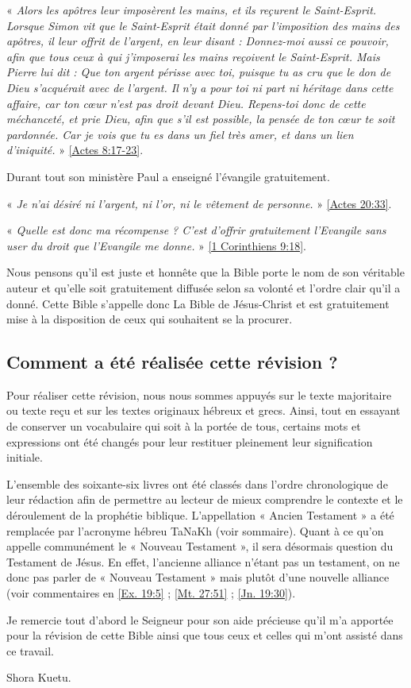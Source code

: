 « \emph{Alors les apôtres leur imposèrent les mains, et ils reçurent le Saint-Esprit. Lorsque Simon vit que le Saint-Esprit était donné par l'imposition des mains des apôtres, il leur offrit de l'argent, en leur disant : Donnez-moi aussi ce pouvoir, afin que tous ceux à qui j'imposerai les mains reçoivent le Saint-Esprit. Mais Pierre lui dit : Que ton argent périsse avec toi, puisque tu as cru que le don de Dieu s'acquérait avec de l'argent. Il n’y a pour toi ni part ni héritage dans cette affaire, car ton cœur n'est pas droit devant Dieu. Repens-toi donc de cette méchanceté, et prie Dieu, afin que s'il est possible, la pensée de ton cœur te soit pardonnée. Car je vois que tu es dans un fiel très amer, et dans un lien d'iniquité.} » \vref{Actes 8:17-23}.

Durant tout son ministère Paul a enseigné l’évangile gratuitement.

« \emph{Je n'ai désiré ni l'argent, ni l'or, ni le vêtement de personne.} » \vref{Actes 20:33}.

« \emph{Quelle est donc ma  récompense ? C’est d’offrir gratuitement l’Evangile sans user du droit que l'Evangile me donne.} » \vref{1 Corinthiens 9:18}.

Nous pensons qu’il est juste et honnête que la Bible porte le nom de son véritable auteur et qu’elle soit gratuitement diffusée selon sa volonté et l’ordre clair qu’il a donné. Cette Bible s’appelle donc La Bible de Jésus-Christ et est gratuitement mise à la disposition de ceux qui souhaitent se la procurer. 

\subsection*{Comment a été réalisée cette révision ?}

Pour réaliser cette révision, nous nous sommes appuyés sur le texte majoritaire ou texte reçu et sur les textes originaux hébreux et grecs. Ainsi, tout en essayant de conserver un vocabulaire qui soit à la portée de tous, certains mots et expressions ont été changés pour leur restituer pleinement leur signification initiale.

L’ensemble des soixante-six livres ont été classés dans l’ordre chronologique de leur rédaction afin de permettre au lecteur de mieux comprendre le contexte et le déroulement de la prophétie biblique. L’appellation « Ancien Testament » a été remplacée par l’acronyme hébreu TaNaKh (voir sommaire). Quant à ce qu’on appelle communément le « Nouveau Testament », il sera désormais question du Testament de Jésus. En effet, l’ancienne alliance n’étant pas un testament, on ne donc pas parler de « Nouveau Testament » mais plutôt d’une nouvelle alliance (voir commentaires en \vref{Ex. 19:5} ; \vref{Mt. 27:51} ; \vref{Jn. 19:30}).

Je remercie tout d’abord le Seigneur pour son aide précieuse qu’il m’a apportée pour la révision de cette Bible ainsi que tous ceux et celles qui m’ont assisté dans ce travail.

Shora Kuetu.
